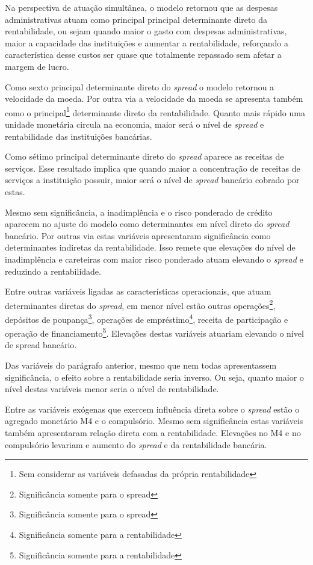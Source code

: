 \documentclass[
  12pt,
  12pt,
  openright,
  oneside,
  a4paper,
  chapter=TITLE,
  section=TITLE,
  subsection=TITLE,
  subsubsection=TITLE,
  english,
  portugues,
  sumario=tradicional]{abntex2}
\begin{document}
Na perspectiva de atuação simultânea, o modelo retornou que as despesas administrativas atuam como principal principal determinante direto da rentabilidade, ou sejam quando maior o gasto com despesas administrativas, maior a capacidade das instituições e aumentar a rentabilidade, reforçando a característica desse custos ser quase que totalmente repassado sem afetar a margem de lucro.

Como sexto principal determinante direto do \emph{spread} o modelo retornou a velocidade da moeda. Por outra via a velocidade da moeda se apresenta também como o principal\footnote{Sem considerar as variáveis defasadas da própria rentabilidade} determinante direto da rentabilidade. Quanto mais rápido uma unidade monetária circula na economia, maior será o nível de \emph{spread} e rentabilidade das instituições bancárias.

Como sétimo principal determinante direto do \emph{spread} aparece as receitas de serviços. Esse resultado implica que quando maior a concentração de receitas de serviços a instituição possuir, maior será o nível de \emph{spread} bancário cobrado por estas.

Mesmo sem significância, a inadimplência e o risco ponderado de crédito aparecem no ajuste do modelo como determinantes em nível direto do \emph{spread} bancário. Por outras via estas variáveis apresentaram significância como determinantes indiretas da rentabilidade. Isso remete que elevações do nível de inadimplência e careteiras com maior risco ponderado atuam elevando o \emph{spread} e reduzindo a rentabilidade.

Entre outras variáveis ligadas as características operacionais, que atuam determinantes diretas do \emph{spread}, em menor nível estão outras operações\footnote{Significância somente para o spread}, depósitos de poupança\footnote{Significância somente para o spread}, operações de empréstimo\footnote{Significância somente para a rentabilidade}, receita de participação e operação de financiamento\footnote{Significância somente para a rentabilidade}. Elevações destas variáveis atuariam elevando o nível de spread bancário.

Das variáveis do parágrafo anterior, mesmo que nem todas apresentassem significância, o efeito sobre a rentabilidade seria inverso. Ou seja, quanto maior o nível destas variáveis menor seria o nível de rentabilidade.

Entre as variáveis exógenas que exercem influência direta sobre o \emph{spread} estão o agregado monetário M4 e o compulsório. Mesmo sem significância estas variáveis também apresentaram relação direta com a rentabilidade. Elevações no M4 e no compulsório levariam e aumento do \emph{spread} e da rentabilidade bancária.
\end{document}
